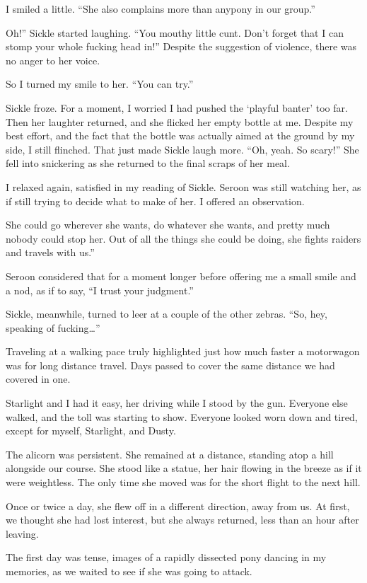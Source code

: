 I smiled a little. “She also complains more than anypony in our group.”

\leavevmode{}Oh!” Sickle started laughing. “You mouthy little cunt. Don’t forget that I can stomp your whole fucking head in!” Despite the suggestion of violence, there was no anger to her voice.

So I turned my smile to her. “You can try.”

Sickle froze. For a moment, I worried I had pushed the ‘playful banter’ too far. Then her laughter returned, and she flicked her empty bottle at me. Despite my best effort, and the fact that the bottle was actually aimed at the ground by my side, I still flinched. That just made Sickle laugh more. “Oh, yeah. So scary!” She fell into snickering as she returned to the final scraps of her meal.

I relaxed again, satisfied in my reading of Sickle. Seroon was still watching her, as if still trying to decide what to make of her. I offered an observation.

\leavevmode{}She could go wherever she wants, do whatever she wants, and pretty much nobody could stop her. Out of all the things she could be doing, she fights raiders and travels with us.”

Seroon considered that for a moment longer before offering me a small smile and a nod, as if to say, “I trust your judgment.”

Sickle, meanwhile, turned to leer at a couple of the other zebras. “So, hey, speaking of fucking…”

{\br}%
Traveling at a walking pace truly highlighted just how much faster a motorwagon was for long distance travel. Days passed to cover the same distance we had covered in one.

Starlight and I had it easy, her driving while I stood by the gun. Everyone else walked, and the toll was starting to show. Everyone looked worn down and tired, except for myself, Starlight, and Dusty.

The alicorn was persistent. She remained at a distance, standing atop a hill alongside our course. She stood like a statue, her hair flowing in the breeze as if it were weightless. The only time she moved was for the short flight to the next hill.

Once or twice a day, she flew off in a different direction, away from us. At first, we thought she had lost interest, but she always returned, less than an hour after leaving.

The first day was tense, images of a rapidly dissected pony dancing in my memories, as we waited to see if she was going to attack.

